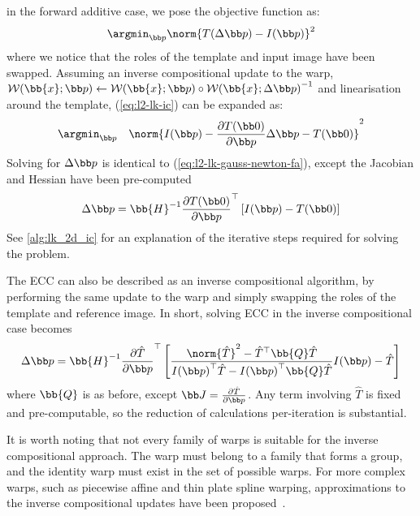 in the forward additive case, we pose the objective function as:
\begin{equation}\label{eq:l2-lk-ic}
    \argmin_{\p} \norm{T(\Delta \p) - I(\p)}^2
\end{equation}
where we notice that the roles of the template and input image have been
swapped. Assuming an inverse compositional update to the warp,
$\mathcal{W}(\bb{x};\p) \leftarrow \mathcal{W}(\bb{x};\p) \circ {\mathcal{W}(\bb{x};\Delta \p)}^{-1}$
and linearisation around the template, (\ref{eq:l2-lk-ic}) can be expanded as:
\begin{equation}\label{eq:l2-lk-linearised-ic}
    \argmin_{\p} \quad \norm{I(\p) - \frac{\partial T(\zero)}{\partial \p} \Delta \p - T(\zero)}^2
\end{equation}
Solving for $\Delta \p$ is identical to (\ref{eq:l2-lk-gauss-newton-fa}), except
the Jacobian and Hessian have been pre-computed
\begin{equation}\label{eq:l2-lk-gauss-newton-ic}
    \Delta \p = \bb{H}^{-1} \frac{\partial T(\zero)}{\partial \p}^{\top} \left[ I(\p) - T(\zero) \right]
\end{equation}
See \cref{alg:lk_2d_ic} for an explanation of the iterative steps required
for solving the problem.

The ECC can also be described as an inverse compositional algorithm, by
performing the same update to the warp and simply swapping the roles of the
template and reference image. In short, solving ECC in the inverse compositional
case becomes
\begin{equation}\label{eq:ecc-lk-gauss-newton-ic}
    \Delta \p = \bb{H}^{-1} \frac{\partial \hat{T}}{\partial \p}^{\top} \left[ \frac{\norm{\hat{T}}^2 - \hat{T}^{\top} \bb{Q} \hat{T}}{{I(\p)}^{\top} \hat{T} - {I(\p)}^{\top} \bb{Q} \hat{T}} I(\p) - \hat{T} \right]
\end{equation}
where $\bb{Q}$ is as before, except $\J = \frac{\partial \hat{T}}{\partial \p}$.
Any term involving $\hat{T}$ is fixed and pre-computable, so the reduction of
calculations per-iteration is substantial.

It is worth noting that not every family of warps is suitable for the inverse
compositional approach. The warp must belong to a family that forms a group, and
the identity warp must exist in the set of possible warps. For more complex
warps, such as piecewise affine and thin plate spline warping, approximations to
the inverse compositional updates have been
proposed~\cite{matthews2004active,papandreou2008adaptive}.


